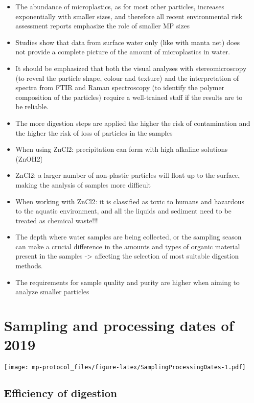 \documentclass[
  icelandic,
]{book}
\providecommand{\tightlist}{%
  \setlength{\itemsep}{0pt}\setlength{\parskip}{0pt}}
\begin{document}
\begin{itemize}
\tightlist
\item
  The abundance of microplastics, as for most other particles, increases exponentially with smaller sizes, and therefore all recent environmental risk assessment reports emphasize the role of smaller MP sizes
\item
  Studies show that data from surface water only (like with manta net) does not provide a complete picture of the amount of microplastics in water.
\item
  It should be emphasized that both the visual analyses with stereomicroscopy (to reveal the particle shape, colour and texture) and the interpretation of spectra from FTIR and Raman spectroscopy (to identify the polymer composition of the particles) require a well-trained staff if the results are to be reliable.
\item
  The more digestion steps are applied the higher the risk of contamination and the higher the risk of loss of particles in the samples
\item
  When using ZnCl2: precipitation can form with high alkaline solutions (ZnOH2)
\item
  ZnCl2: a larger number of non-plastic particles will float up to the surface, making the analysis of samples more difficult
\item
  When working with ZnCl2: it is classified as toxic to humans and hazardous to the aquatic environment, and all the liquids and sediment need to be treated as chemical waste!!!
\item
  The depth where water samples are being collected, or the sampling season can make a crucial difference in the amounts and types of organic material present in the samples -\textgreater{} affecting the selection of most suitable digestion methods.
\item
  The requirements for sample quality and purity are higher when aiming to analyze smaller particles
\end{itemize}

\hypertarget{sampling-and-processing-dates-of-2019}{%
\chapter{Sampling and processing dates of 2019}\label{sampling-and-processing-dates-of-2019}}

\texttt{[image: mp-protocol\_files/figure-latex/SamplingProcessingDates-1.pdf]}

\hypertarget{efficiency-of-digestion}{%
\section{Efficiency of digestion}\label{efficiency-of-digestion}}
\end{document}
